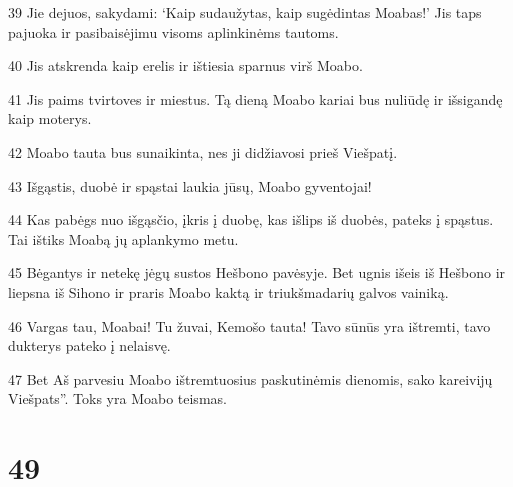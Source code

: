 \par 39 Jie dejuos, sakydami: ‘Kaip sudaužytas, kaip sugėdintas Moabas!’ Jis taps pajuoka ir pasibaisėjimu visoms aplinkinėms tautoms. 
\par 40 Jis atskrenda kaip erelis ir ištiesia sparnus virš Moabo. 
\par 41 Jis paims tvirtoves ir miestus. Tą dieną Moabo kariai bus nuliūdę ir išsigandę kaip moterys. 
\par 42 Moabo tauta bus sunaikinta, nes ji didžiavosi prieš Viešpatį. 
\par 43 Išgąstis, duobė ir spąstai laukia jūsų, Moabo gyventojai! 
\par 44 Kas pabėgs nuo išgąsčio, įkris į duobę, kas išlips iš duobės, pateks į spąstus. Tai ištiks Moabą jų aplankymo metu. 
\par 45 Bėgantys ir netekę jėgų sustos Hešbono pavėsyje. Bet ugnis išeis iš Hešbono ir liepsna iš Sihono ir praris Moabo kaktą ir triukšmadarių galvos vainiką. 
\par 46 Vargas tau, Moabai! Tu žuvai, Kemošo tauta! Tavo sūnūs yra ištremti, tavo dukterys pateko į nelaisvę. 
\par 47 Bet Aš parvesiu Moabo ištremtuosius paskutinėmis dienomis,­ sako kareivijų Viešpats”. Toks yra Moabo teismas.



\chapter{49}


